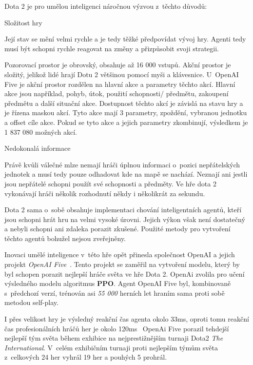 Dota 2 je pro umělou inteligenci náročnou výzvou z~těchto důvodů:
\begin{myitemize}
  \item Složitost hry

  Její stav se mění velmi rychle a je tedy těžké předpovídat vývoj hry.
  Agenti tedy musí být schopni rychle reagovat na změny a přizpůsobit svoji strategii.

  Pozorovací prostor je obrovský, obsahuje až 16 000 vstupů.
  Akční prostor je složitý, jelikož lidé hrají Dotu 2 většinou pomocí myši a klávesnice.
  U~OpenAI Five je akční prostor rozdělen na hlavní akce a parametry těchto akcí.
  Hlavní akce jsou například, pohyb, útok, použití schopnosti/ předmětu, zakoupení předmětu a další situační akce.
  Dostupnost těchto akcí je závislá na stavu hry a je řízena maskou akcí.
  Tyto akce mají 3 parametry, zpoždění, vybranou jednotku a offset cíle akce.
  Pokud se tyto akce a jejich parametry zkombinují, výsledkem je 1 837 080 možných akcí.

  \item Nedokonalá informace

  Právě kvůli válečné mlze nemají hráči úplnou informaci o~pozici nepřátelských jednotek a musí tedy pouze odhadovat kde na mapě se nachází.
  Neznají ani jestli jsou nepřátelé schopni použít své schopnosti a předměty.
  Ve hře dota 2 vykonávají hráči několik rozhodnutí někdy i několikrát za sekundu.
\end{myitemize}

Dota 2 sama o~sobě obsahuje implementaci chování inteligentních agentů, kteří jsou schopni hrát hru na velmi vysoké úrovni.
Jejich výkon však není dostatečný a nebyli schopni ani zdaleka porazit zkušené.
Použité metody pro vytvoření těchto agentů bohužel nejsou zveřejněny.

Inovaci umělé inteligence v~této hře opět přinesla společnost OpenAI a jejich projekt \emph{OpenAI Five}~\cite{Dota2}.
Tento projekt se zaměřil na vytvoření modelu, který by byl schopen porazit nejlepší hráče světa ve hře Dota 2.
OpenAi zvolila pro učení výsledného modelu algoritmus \textbf{PPO}.
Agent OpenAI Five byl, kombinovaně s~předchozí verzí, trénován asi \emph{55 000} herních let hraním sama proti sobě metodou self-play.

I přes velikost hry je výsledný reakční čas agenta okolo 33ms, oproti tomu reakční čas profesionálních hráčů her je okolo 120ms~\cite{reaction_time}
OpenAi Five porazil tehdejší nejlepší tým světa během exhibice na nejprestižnějším turnaji Dota2 \textit{The International}.
V~celém exhibičním turnaji proti nejlepším týmům světa z~celkových 24 her vyhrál 19 her a pouhých 5 prohrál.

